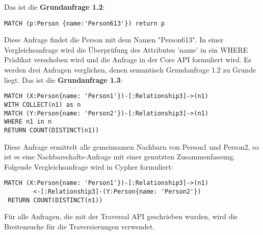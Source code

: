 \noindent Das ist die \textbf{Grundanfrage 1.2}: 
\begin{Verbatim}[frame=single]
MATCH (p:Person {name:'Person613'}) return p
\end{Verbatim} 
Diese Anfrage findet die Person mit dem Namen "Person613". In einer Vergleichsanfrage wird die Überprüfung des Attributes 'name' in ein WHERE Prädikat verschoben wird und die Anfrage  in der Core API formuliert wird. Es werden drei Anfragen verglichen, denen semantisch Grundanfrage 1.2 zu Grunde liegt.\newline \newline
Das ist die \textbf{Grundanfrage 1.3}: 
\begin{Verbatim}[frame=single]
MATCH (X:Person{name: 'Person1'})-[:Relationship3]->(n1) 
WITH COLLECT(n1) as n 
MATCH (Y:Person{name: 'Person2'})-[:Relationship3]->(n1) 
WHERE n1 in n
RETURN COUNT(DISTINCT(n1))
\end{Verbatim} 
Diese Anfrage ermittelt alle gemeinsamen Nachbarn von Person1 und Person2, so ist es eine Nachbarschafts-Anfrage mit einer genutzten Zusammenfassung. Folgende Vergleichsanfrage wird  in Cypher formuliert:
\begin{Verbatim}[frame=single]
 MATCH (X:Person{name: 'Person1'})-[:Relationship3]->(n1)
 		<-[:Relationship3]-(Y:Person{name: 'Person2'}) 
 RETURN COUNT(DISTINCT(n1))
\end{Verbatim} 
Für alle Anfragen, die mit der Traversal API geschrieben wurden, wird die Breitensuche für die Traversierungen verwendet. 
